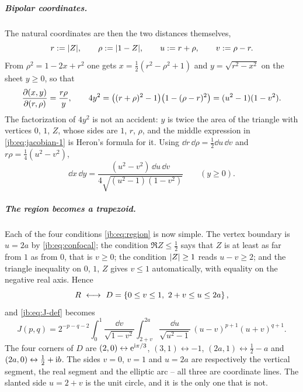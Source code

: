 \subparagraph{Bipolar coordinates.}
The natural coordinates are then the two distances themselves,
\begin{equation}
  \label{jb:eq:uv-def}
  r
    := {|Z|},
  \qquad
  \rho
    := {|1 - Z|},
  \qquad
  u
    := r + \rho,
  \qquad
  v
    := \rho - r .
\end{equation}
From $\rho^2 = 1 - 2x + r^2$ one gets $x = \tfrac12 (r^2 - \rho^2 + 1)$ and $y = \sqrt{r^2 - x^2}$ on
the sheet $y \ge 0$, so that
\begin{equation}
  \label{jb:eq:jacobian-1}
  \frac{\partial (x, y)}{\partial (r, \rho)}
    = \frac{r \rho}{y},
  \qquad
  4 y^2
    = \bigl( (r + \rho)^2 - 1 \bigr) \bigl( 1 - (\rho - r)^2 \bigr)
    = (u^2 - 1)(1 - v^2).
\end{equation}
The factorization of $4y^2$ is not an accident: $y$ is twice the area of the triangle with vertices
$0$, $1$, $Z$, whose sides are $1$, $r$, $\rho$, and the middle expression in
\eqref{jb:eq:jacobian-1} is Heron's formula for it.
Using $\dd r \, \dd \rho = \tfrac12 \dd u \, \dd v$ and $r \rho = \tfrac14 (u^2 - v^2)$,
\begin{equation}
  \label{jb:eq:jacobian-2}
  \dd x \, \dd y
    = \frac{(u^2 - v^2) \, \dd u \, \dd v}{4 \sqrt{(u^2 - 1)(1 - v^2)}}
  \qquad (y \ge 0).
\end{equation}

\subparagraph{The region becomes a trapezoid.}
Each of the four conditions \eqref{jb:eq:region} is now simple.
The vertex boundary is $u = 2a$ by \eqref{jb:eq:confocal}; the condition $\Re Z \le \tfrac12$ says that
$Z$ is at least as far from $1$ as from $0$, that is $v \ge 0$; the condition ${|Z|} \ge 1$ reads
$u - v \ge 2$; and the triangle inequality on $0$, $1$, $Z$ gives $v \le 1$ automatically, with
equality on the negative real axis.
Hence
\begin{equation}
  \label{jb:eq:trapezoid}
  R
    \ \longleftrightarrow \
    D
    = \left \{  0 \le v \le 1, \ 2 + v \le u \le 2a  \right \},
\end{equation}
and \eqref{jb:eq:J-def} becomes
\begin{equation}
  \label{jb:eq:J-uv}
  J(p, q)
    = 2^{-p-q-2} \int_0^1 \frac{\dd v}{\sqrt{1 - v^2}}
      \int_{2+v}^{2a} \frac{\dd u}{\sqrt{u^2 - 1}} \,
      (u - v)^{p+1} (u + v)^{q+1} .
\end{equation}
The four corners of $D$ are $(2, 0) \leftrightarrow \mathrm{e}^{\mathrm{i} \pi/3}$,
$(3, 1) \leftrightarrow -1$, $(2a, 1) \leftrightarrow \tfrac12 - a$ and
$(2a, 0) \leftrightarrow \tfrac12 + \mathrm{i} b$.
The sides $v = 0$, $v = 1$ and $u = 2a$ are respectively the vertical segment, the real segment and
the elliptic arc -- all three are coordinate lines.
The slanted side $u = 2 + v$ is the unit circle, and it is the only one that is not.

